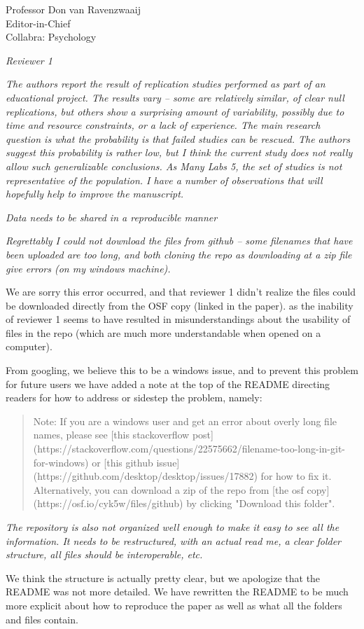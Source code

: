 \documentclass{stanfordletter}
\newcommand{\theysaid}[1]{\begin{leftbar} \noindent 
		\textsl{ #1}\end{leftbar}}
\newcommand{\revised}[1]{\begin{quote}	#1 \end{quote}}
\begin{document}
\begin{letter}{Professor Don van Ravenzwaaij \\ Editor-in-Chief \\ Collabra: Psychology }
		
		\theysaid{Reviewer 1}

		
		\theysaid{The authors report the result of replication studies performed as part of an educational project. The results vary – some are relatively similar, of clear null replications, but others show a surprising amount of variability, possibly due to time and resource constraints, or a lack of experience. The main research question is what the probability is that failed studies can be rescued. The authors suggest this probability is rather low, but I think the current study does not really allow such generalizable conclusions. As Many Labs 5, the set of studies is not representative of the population. I have a number of observations that will hopefully help to improve the manuscript.}
		
		\theysaid{Data needs to be shared in a reproducible manner}
		\theysaid{Regrettably I could not download the files from github – some filenames that have been uploaded are too long, and both cloning the repo as downloading at a zip file give errors (on my windows machine). }
		
		We are sorry this error occurred, and that reviewer 1 didn't realize the files could be downloaded directly from the OSF copy (linked in the paper).  as the inability of reviewer 1 seems to have resulted in misunderstandings about the usability of files in the repo (which are much more understandable when opened on a computer).
		
		From googling, we believe this to be a windows issue, and to prevent this problem for future users we have added a note at the top of the README directing readers for how to address or sidestep the problem, namely:
		
		\revised{Note: If you are a windows user and get an error about overly long file names, please see [this stackoverflow post](https://stackoverflow.com/questions/22575662/filename-too-long-in-git-for-windows) or [this github issue](https://github.com/desktop/desktop/issues/17882) for how to fix it. Alternatively, you can download a zip of the repo from [the osf copy](https://osf.io/cyk5w/files/github) by clicking "Download this folder".}
		
		\theysaid{The repository is also not organized well enough to make it easy to see all the information. It needs to be restructured, with an actual read me, a clear folder structure, all files should be interoperable, etc. 
		}
		
		We think the structure is actually pretty clear, but we apologize that the README was not more detailed. We have rewritten the README to be much more explicit about how to reproduce the paper as well as what all the folders and files contain.
		

\end{letter}
\end{document}
